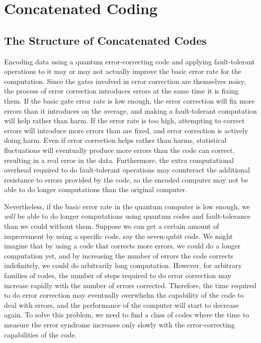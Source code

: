 \chapter{Concatenated Coding}
\label{chap-concatenation}

\section{The Structure of Concatenated Codes}

Encoding data using a quantum error-correcting code and applying
fault-tol\-er\-ant operations to it may or may not actually improve the basic
error rate for the computation.  Since the gates involved in error correction
are themselves noisy, the process of error correction introduces errors at
the same time it is fixing them.  If the basic gate error rate is low enough,
the error correction will fix more errors than it introduces on the average,
and making a fault-tolerant computation will help rather than harm.  If
the error rate is too high, attempting to correct errors will introduce more
errors than are fixed, and error correction is actively doing harm.  Even if
error correction helps rather than harms, statistical fluctuations will
eventually produce more errors than the code can correct, resulting in a
real error in the data.  Furthermore, the extra computational overhead
required to do fault-tolerant operations may counteract the additional
resistance to errors provided by the code, so the encoded computer may
not be able to do longer computations than the original computer.

Nevertheless, if the basic error rate in the quantum computer is low
enough, we {\em will} be able to do longer computations using quantum
codes and fault-tolerance than we could without them.  Suppose we can get
a certain amount of improvement by using a specific code, say the seven-qubit
code.  We might imagine that by using a code that corrects more errors, we
could do a longer computation yet, and by increasing the number of errors
the code corrects indefinitely, we could do arbitrarily long computation.
However, for arbitrary families of codes, the number of steps required to
do error correction may increase rapidly with the number of errors
corrected.  Therefore, the time required to do error correction may
eventually overwhelm the capability of the code to deal with errors, and
the performance of the computer will start to decrease again.  To solve this
problem, we need to find a class of codes where the time to measure the
error syndrome increases only slowly with the error-correcting capabilities
of the code.

